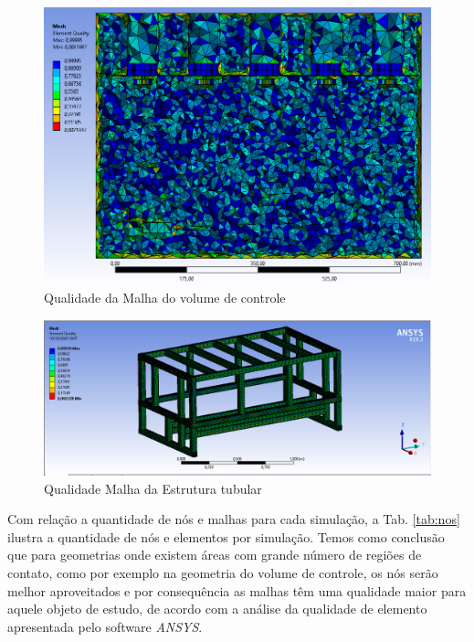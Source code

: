     
\begin{figure}[H]
        \centering
        \includegraphics[width=.9\textwidth]{figuras/estrutura/InteracaoFusoEng/meshqualityT.png}
        \caption{Qualidade da Malha do volume de controle}
        \label{fig:malha_vol}
    \end{figure}
   \begin{figure}[H]
        \centering
        \includegraphics[width=.9\textwidth]{figuras/estrutura/InteracaoFusoEng/ElementQuality_Tubular.png}
        \caption{Qualidade Malha da Estrutura tubular}
        \label{fig:malha_carc}
    \end{figure} 
    

Com relação a quantidade de nós e malhas para cada simulação, a Tab. \ref{tab:nos} ilustra a quantidade de nós e elementos por simulação. Temos como conclusão que para geometrias onde existem áreas com grande número de regiões de contato, como por exemplo na geometria do volume de controle, os nós serão melhor aproveitados e por consequência as malhas têm uma qualidade maior para aquele objeto de estudo, de acordo com a análise da qualidade de elemento apresentada pelo software \textit{ANSYS}.

